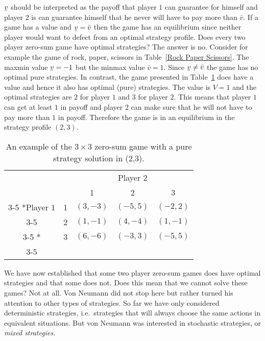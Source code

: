 \documentclass{article}
\theoremstyle{definition}
\theoremstyle{remark}
\newcommand{\ubar}[1]{\underaccent{\bar}{#1}}
\begin{document}
$\ubar{v}$ should be interpreted as the payoff that player $1$ can
guarantee for himself and player $2$ is can guarantee himself that he
never will have to pay more than $\bar{v}$. If a game has a value and
$\ubar{v} = \bar{v}$ then the game has an equilibrium since neither
player would want to defect from an optimal strategy profile. Does
every two player zero-sum game have optimal strategies? The answer is
no. Consider for example the game of rock, paper, scissors in
Table~\ref{Rock Paper Scissors}. The maxmin value $\ubar{v} = -1$ but
the minmax value $\bar{v} = 1$. Since $\ubar{v} \neq \bar{v}$ the game
has no optimal pure strategies. In contrast, the game presented in
Table~\ref{value game} does have a value and hence it also has optimal
(pure) strategies. The value is $V = 1$ and the optimal strategies are
$2$ for player $1$ and $3$ for player $2$. This means that player $1$
can get at least $1$ in payoff and player $2$ can make sure that he
will not have to pay more than $1$ in payoff. Therefore the game is in
an equilibrium in the strategy profile $(2,3)$.

\begin{table}[h!]
  \begin{center}
    \setlength{\extrarowheight}{2pt}
    \begin{tabular}{cc|c|c|c|}
      & \multicolumn{2}{c}{} & \multicolumn{1}{c}{Player $2$} & \multicolumn{1}{c}{}\\
      & \multicolumn{1}{c}{} & \multicolumn{1}{c}{1}  &
                                                          \multicolumn{1}{c}{2} & \multicolumn{1}{c}{3} \\\cline{3-5}
      \multirow{2}*{Player $1$}  & 1 & $(3,-3)$ & $(-5,5)$ & $(-2,2)$\\\cline{3-5}
      & 2 & $(1,-1)$ & $(4,-4)$ & $(1,-1)$\\\cline{3-5}
           \multirow{1}*{}  & 3 & $(6,-6)$ & $(-3,3)$ & $(-5,5)$\\\cline{3-5}   \end{tabular}
    \caption{An example of the $3\times 3$ zero-sum game with a pure
      strategy solution in (2,3).}
    \label{value game}
    \end{center}
  \end{table}

We have now established that some two player zero-sum games does have
optimal strategies and that some does not. Does this mean that we
cannot solve these games? Not at all. Von Neumann did not stop here
but rather turned his attention to other types of strategies. So far
we have only considered deterministic strategies, i.e.\ strategies
that will always choose the same actions in equivalent situations. But
von Neumann was interested in stochastic strategies, or \emph{mixed
  strategies}.
\end{document}
